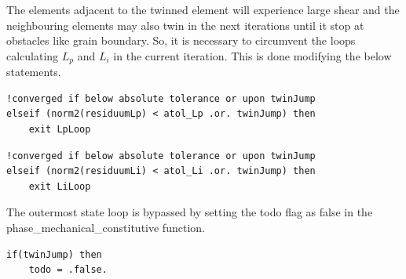 The elements adjacent to the twinned element will experience large shear and the neighbouring elements may also twin in the next iterations until it stop at obstacles like grain boundary. So, it is necessary to circumvent the loops calculating $L_p$ and $L_i$ in the current iteration. This is done modifying the below statements.

\begin{verbatim}
!converged if below absolute tolerance or upon twinJump
elseif (norm2(residuumLp) < atol_Lp .or. twinJump) then      
    exit LpLoop
\end{verbatim}

\begin{verbatim}
!converged if below absolute tolerance or upon twinJump
elseif (norm2(residuumLi) < atol_Li .or. twinJump) then      
    exit LiLoop
\end{verbatim}

The outermost state loop is bypassed by setting the todo flag as false in the \\ phase\_mechanical\_constitutive function.
\begin{verbatim}
if(twinJump) then
    todo = .false.
\end{verbatim}

